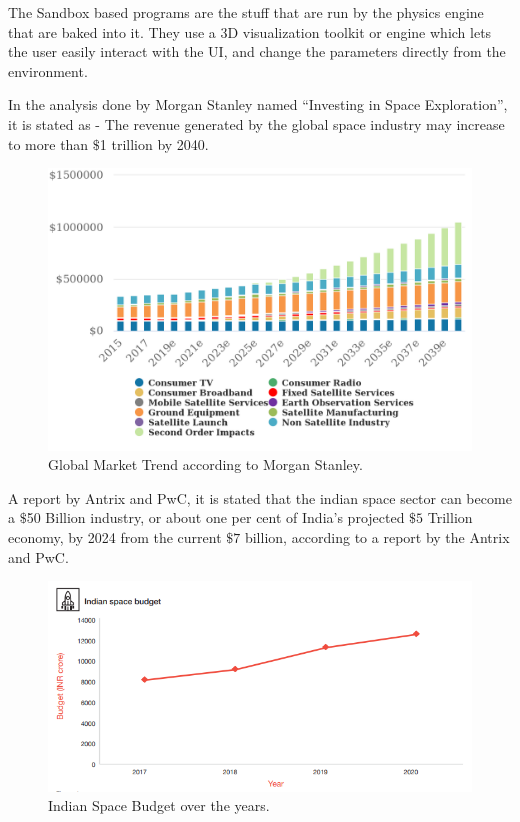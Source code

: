 \documentclass[12pt]{article}
\begin{document}
The Sandbox based programs are the stuff that are run by the physics engine that are baked into it. They use a 3D visualization toolkit or engine which lets the user easily interact with the UI, and change the parameters directly from the environment.

In the analysis done by Morgan Stanley named \enquote{Investing in Space Exploration}, it is stated as - The revenue generated by the global space industry may increase to more than $\$$1 trillion by 2040. \cite{morgan}
\begin{figure}[H]
\centering
\includegraphics[scale=0.25]{morganstanley.png}
\caption{Global Market Trend according to Morgan Stanley.} \label{morgangraph}
\end{figure}
A report by Antrix and PwC, it is stated that the indian space sector can become a $\$$50 Billion industry, or about one per cent of India's projected $\$5$ Trillion economy, by 2024 from the current $\$7$ billion, according to a report by the Antrix and PwC.\cite{indiaspace}
\begin{figure}[H]
\centering
\includegraphics[scale=1]{pwc.png}
\caption{Indian Space Budget over the years.} \label{pwc}
\end{figure}
\end{document}
